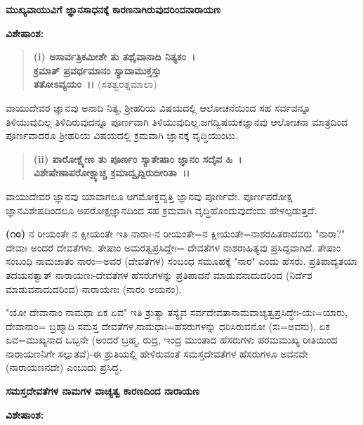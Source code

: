 \begin{center}
\textbf{ಮುಖ್ಯವಾಯುವಿಗೆ ಜ್ಞಾನಸಾಧನಕ್ಕೆ ಕಾರಣನಾಗಿರುವುದರಿಂದನಾರಾಯಣ}
\end{center}

\noindent
\textbf{ವಿಶೇಷಾಂಶ:\enginline{-}}

\begin{verse}
\textbf{(i) ಅಸಾರ್ವತ್ರಿಕಮೀಶೇ ತು ತಥೈವಾನಾದಿ ನಿತ್ಯಕಂ~।}\\\textbf{ಕ್ರಮಾತ್ ಪ್ರವರ್ಧಮಾನಂ ಸ್ಯಾದಾಮುಕ್ತಸ್ತು}\\\textbf{ತತೋಽವ್ಯಯಂ~।।} (ಸತತ್ವರತ್ನಮಾಲಾ)
\end{verse}

\noindent
ವಾಯುದೇವರ ಜ್ಞಾನವು ಅನಾದಿ ನಿತ್ಯ, ಶ‍್ರೀಹರಿಯ ವಿಷಯದಲ್ಲಿ ಆಲೋಚನೆಯಿಂದ ಸಹ ಸರ್ವವನ್ನೂ ತಿಳಿಯುವುದಿಲ್ಲ ತಿಳಿದಿರುವುದನ್ನೂ ಪೂರ್ಣವಾಗಿ ತಿಳಿಯುವುದಿಲ್ಲ.\break ಜಗದ್ವಿಷಯಕಜ್ಞಾನವು ಆಲೋಚನಾ ಮಾತ್ರದಿಂದ ಪೂರ್ಣವಾದರೂ ಶ‍್ರೀಹರಿಯ ವಿಷಯದಲ್ಲಿ ಕ್ರಮವಾಗಿ ಜ್ಞಾನಕ್ಕೆ ವೃದ್ಧಿಯುಂಟು.

\begin{verse}
\textbf{(ii) ಪಾರೋಕ್ಷ್ಯೇಣ ತು ಪೂರ್ಣಂ ಸ್ಯಾತೇಷಾಂ ಜ್ಞಾನಂ ಸದೈವ ಹಿ~।}\\\textbf{ವಿಶೇಷೇಣಾಪರೋಕ್ಷ್ಯಾಚ್ಚ ಕ್ರಮಾದ್ವೃದ್ದಿರುದೀರಿತಾ~।।}
\end{verse}


\noindent
ವಾಯುದೇವರ ಜ್ಞಾನವು ಯಾವಾಗಲೂ ಆಗಮೋಕ್ತವೃತ್ತಿ ಜ್ಞಾನವು ಪೂರ್ಣವೇ. ಪೂರ್ಣಪರೋಕ್ಷ ಜ್ಞಾನವಿಶೇಷದಿಂದಲೂ ಅಪರೋಕ್ಷಜ್ಞಾನದಿಂದ ಸಹ ಕ್ರಮವಾಗಿ ವೃದ್ಧಿಹೊಂದುವುದೆಂದು ಹೇಳಲ್ಪಡುತ್ತದೆ.

\textbf{(೧೦)} ನ ರೀಯಂತೇ ನ ಕ್ಷೀಯಂತೇ ಇತಿ ನಾರಾಃ-ನ ರೀಯಂತೇ=ನ ಕ್ಷೀಯಂತೇ=ನಾಶ\-ರಹಿತರಾದವರು "ನಾರಾ?" ದೇವಾಃ ಅಂದರೆ ದೇವತೆಗಳು. ತೇಷಾಂ ಅಮರತ್ವಪ್ರಸಿದ್ದೇಃ= ದೇವತೆಗಳ ನಾಶರಾಹಿತ್ಯವು ಪ್ರಸಿದ್ದವಾಗಿದೆ. ತೇಷಾಂ ಸಂಬಂಧಿ ನಾಮಜಾತಂ ನಾರಂ=ಅವರ (ದೇವತೆಗಳ) ಸಂಬಂಧ ಸಮೂಹಕ್ಕೆ "ನಾರ" ಎಂದು ಹೆಸರು. ಪ್ರತಿಪಾದ್ಯತಯಾ ತದಯನತ್ವಾತ್ ನಾರಾಯಣಃ-ದೇವತೆಗಳ ಹೆಸರುಗಳನ್ನು ಪ್ರತಿಪಾದನೆ ಮಾಡುವನಾದುದರಿಂದ (ನಿರ್ದೆಶ ಮಾಡುವನಾದುದರಿಂದ) ನಾರಾಯಣಃ (ನಾರಂ ಅಯನಂ).

"ಯೋ ದೇವಾನಾಂ ನಾಮಧಾ ಏಕ ಏವ" ಇತಿ ಶ್ರುತ್ಯಾ ತಸ್ಯೈವ ಸರ್ವದೇವತಾನಾಮವಾಚ್ಯತ್ವಪ್ರಸಿದ್ಧೇಃ-ಯಃ=ಯಾರು, ದೇವಾನಾಂ= ಬ್ರಹ್ಮಾದಿ ಸಮಸ್ತ ದೇವತೆಗಳ,\break ನಾಮಧಾಃ=ಹೆಸರುಗಳನ್ನು ಧರಿಸಿರುವನೋ (ಸಃ=ಅವನು), ಏಕ ಏವ=ಮುಖ್ಯನಾದ ಒಬ್ಬನೇ (ಅಂದರೆ ಬ್ರಹ್ಮ, ರುದ್ರ, ಇಂದ್ರ ಮುಂತಾದ ಹೆಸರುಗಳು ಪರಮಮುಖ್ಯ ರೀತಿಯಿಂದ ನಾರಾಯಣನಿಗೇ ಸಲ್ಲುತವೆ)-ಈ ಶ್ರುತಿಯಲ್ಲಿ ಹೇಳಿರುವಂತೆ ಸಮಸ್ತದೇವತೆಗಳ ಹೆಸರುಗಳೂ ಅವನವೇ (ನಾರಾಯಣನದೇ) ಎಂಬುದು ಪ್ರಸಿದ್ಧ.

\begin{center}
\textbf{ಸಮಸ್ತದೇವತೆಗಳ ನಾಮಗಳ ವಾಚ್ಯತ್ವ ಕಾರಣದಿಂದ ನಾರಾಯಣ}
\end{center}

\noindent
\textbf{ವಿಶೇಷಾಂಶ:\enginline{-}}

